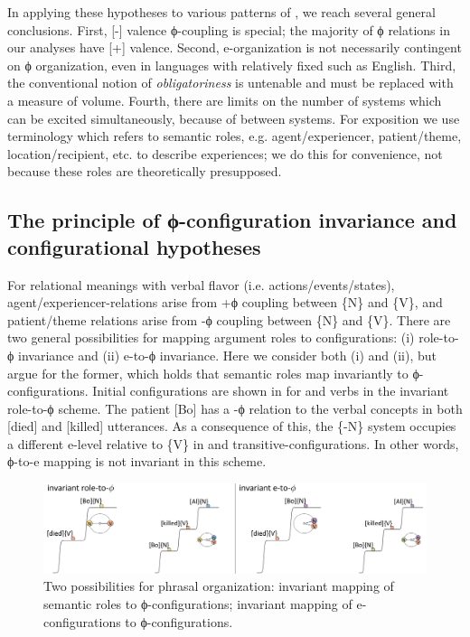   In applying these hypotheses to various patterns of , we reach several general conclusions. First, [-] valence ϕ-coupling is special; the majority of ϕ relations in our analyses have [+] valence. Second, e-organization is not necessarily contingent on ϕ organization, even in languages with relatively fixed  such as English. Third, the conventional notion of \textit{obligatoriness} is untenable and must be replaced with a measure of  volume. Fourth, there are limits on the number of systems which can be excited simultaneously, because of  between systems. For exposition we use terminology which refers to semantic roles, e.g. agent/experiencer, patient/theme, location/recipient, etc. to describe  experiences; we do this for convenience, not because these roles are theoretically presupposed.

\subsection{The principle of \textup{ϕ-configuration} invariance and configurational hypotheses}

For relational meanings with verbal flavor (i.e. actions/events/states), agent/ex\-pe\-ri\-en\-cer-relations arise from +ϕ coupling between \{N\} and \{V\}, and patient/theme relations arise from -ϕ coupling between \{N\} and \{V\}. There are two general possibilities for mapping argument roles to configurations: (i) role-to-ϕ invariance and (ii) e-to-ϕ invariance. Here we consider both (i) and (ii), but argue for the former, which holds that semantic roles map invariantly to ϕ-configurations. Initial configurations are shown in {} for  and  verbs in the invariant role-to-ϕ scheme. The patient [Bo] has a -ϕ relation to the verbal concepts in both  [died] and  [killed] utterances. As a consequence of this, the \{-N\} system occupies a different e-level relative to \{V\} in  and transitive-configurations. In other words, ϕ-to-e mapping is not invariant in this scheme.

  
\begin{figure}
\includegraphics[width=\textwidth]{figures/Tilsen-img71.png}
\caption{Two possibilities for phrasal organization: invariant mapping of semantic roles to ϕ-configurations; invariant mapping of e-configurations to ϕ-configurations.}
\label{fig:4:21}
\end{figure}
 

